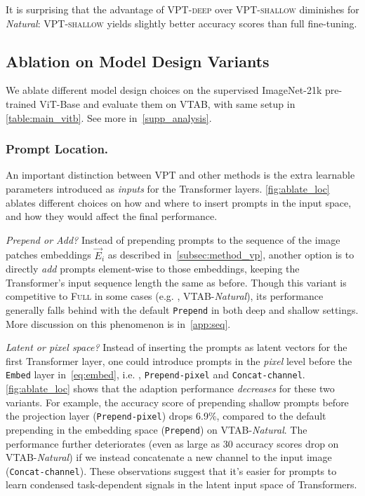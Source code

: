 It is surprising that the advantage of \textsc{VPT}-\textsc{deep} over \textsc{VPT}-\textsc{shallow} diminishes for \textit{Natural}: \textsc{VPT}-\textsc{shallow} yields slightly better accuracy scores than full fine-tuning.

\subsection{Ablation on Model Design Variants}
\label{subsec:ablate}
We ablate different model design choices on the supervised ImageNet-21k pre-trained ViT-Base and evaluate them on VTAB, with same setup in \ref{table:main_vitb}. See more in~\ref{supp_analysis}.

\subsubsection{Prompt Location.} An important distinction between \textsc{VPT} and other methods is the extra learnable parameters introduced as \textit{inputs} for the Transformer layers. 
\ref{fig:ablate_loc} ablates different choices on how and where to insert prompts in the input space, and how they would affect the final performance.

\textit{Prepend or Add?} Instead of prepending prompts to the sequence of the image patches embeddings $\vec{E}_i$ as described in~\ref{subsec:method_vp}, 
another option is to directly \emph{add} prompts element-wise to those embeddings, keeping the Transformer's input sequence length the same as before. Though this variant is competitive to \textsc{Full} in some cases (e.g. , VTAB-\textit{Natural}), its performance generally falls behind with the default \texttt{Prepend} in both deep and shallow settings. More discussion on this phenomenon is in~\ref{app:seq}.

\textit{Latent or pixel space?} Instead of inserting the prompts as latent vectors for the first Transformer layer, one could introduce prompts in the \textit{pixel} level before the \texttt{Embed} layer in~\ref{eq:embed},
i.e. , \texttt{Prepend-pixel} and \texttt{Concat-channel}.
\ref{fig:ablate_loc} shows that the adaption performance \emph{decreases} for these two variants. For example, the accuracy score of prepending shallow prompts before the projection layer (\texttt{Prepend-pixel}) drops 6.9$\%$, compared to the default prepending in the embedding space (\texttt{Prepend}) on VTAB-\textit{Natural}. The performance further deteriorates (even as large as 30 accuracy scores drop on VTAB-\textit{Natural}) if we instead concatenate a new channel to the input image (\texttt{Concat-channel}). These observations suggest that it's easier for prompts to learn condensed task-dependent signals in the latent input space of Transformers.

